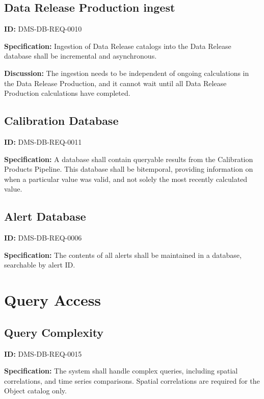 \documentclass[toc]{lsstdoc}
\begin{document}
\subsection{Data Release Production ingest}

\label{DMS-DB-REQ-0010}
\textbf{ID:} DMS-DB-REQ-0010

\textbf{Specification:}
Ingestion of Data Release catalogs into the Data Release database shall be incremental and asynchronous.

\textbf{Discussion:}
The ingestion needs to be independent of ongoing calculations in the Data Release Production, and it cannot wait until all Data Release Production calculations have completed.

\subsection{Calibration Database}

\label{DMS-DB-REQ-0011}
\textbf{ID:} DMS-DB-REQ-0011

\textbf{Specification:}
A database shall contain queryable results from the Calibration Products Pipeline. This database shall be bitemporal, providing information on when a particular value was valid, and not solely the most recently calculated value.

\subsection{Alert Database}

\label{DMS-DB-REQ-0006}
\textbf{ID:} DMS-DB-REQ-0006

\textbf{Specification:}
The contents of all alerts shall be maintained in a database, searchable by alert ID.

\section{Query Access}

\subsection{Query Complexity}

\label{DMS-DB-REQ-0015}
\textbf{ID:} DMS-DB-REQ-0015

\textbf{Specification:}
The system shall handle complex queries, including spatial correlations, and time series comparisons. Spatial correlations are required for the Object catalog only.
\end{document}
